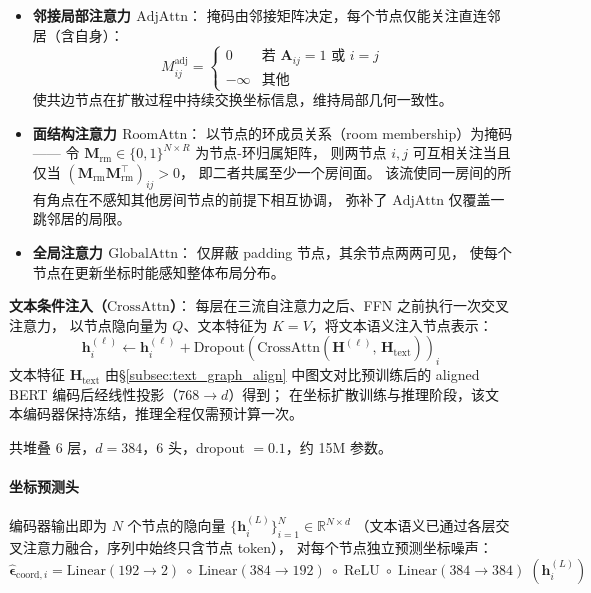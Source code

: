 \begin{itemize}
    \item \textbf{邻接局部注意力 $\mathrm{AdjAttn}$}：
    掩码由邻接矩阵决定，每个节点仅能关注直连邻居（含自身）：
    \begin{equation}
        M_{ij}^{\mathrm{adj}} =
        \begin{cases}
            0       & \text{若 } \mathbf{A}_{ij} = 1 \text{ 或 } i = j \\
            -\infty & \text{其他}
        \end{cases}
        \label{eq:adj_mask}
    \end{equation}
    使共边节点在扩散过程中持续交换坐标信息，维持局部几何一致性。

    \item \textbf{面结构注意力 $\mathrm{RoomAttn}$}：
    以节点的环成员关系（room membership）为掩码——
    令 $\mathbf{M}_{\mathrm{rm}} \in \{0,1\}^{N \times R}$ 为节点-环归属矩阵，
    则两节点 $i,j$ 可互相关注当且仅当 $(\mathbf{M}_{\mathrm{rm}}\mathbf{M}_{\mathrm{rm}}^\top)_{ij} > 0$，
    即二者共属至少一个房间面。
    该流使同一房间的所有角点在不感知其他房间节点的前提下相互协调，
    弥补了 $\mathrm{AdjAttn}$ 仅覆盖一跳邻居的局限。

    \item \textbf{全局注意力 $\mathrm{GlobalAttn}$}：
    仅屏蔽 padding 节点，其余节点两两可见，
    使每个节点在更新坐标时能感知整体布局分布。
\end{itemize}

\noindent
\textbf{文本条件注入（$\mathrm{CrossAttn}$）}：
每层在三流自注意力之后、FFN 之前执行一次交叉注意力，
以节点隐向量为 $Q$、文本特征为 $K{=}V$，将文本语义注入节点表示：
\begin{equation}
    \mathbf{h}_i^{(\ell)} \leftarrow \mathbf{h}_i^{(\ell)}
    + \mathrm{Dropout}\!\left(\mathrm{CrossAttn}(\mathbf{H}^{(\ell)},\, \mathbf{H}_{\mathrm{text}})\right)_{\!i}
    \label{eq:cross_attn}
\end{equation}
文本特征 $\mathbf{H}_{\mathrm{text}}$ 由\S\ref{subsec:text_graph_align} 中图文对比预训练后的
aligned BERT 编码后经线性投影（$768\to d$）得到；
在坐标扩散训练与推理阶段，该文本编码器保持冻结，推理全程仅需预计算一次。

共堆叠 6 层，$d = 384$，6 头，dropout $= 0.1$，约 15M 参数。

\paragraph{坐标预测头}
编码器输出即为 $N$ 个节点的隐向量 $\{\mathbf{h}_i^{(L)}\}_{i=1}^{N} \in \mathbb{R}^{N \times d}$
（文本语义已通过各层交叉注意力融合，序列中始终只含节点 token），
对每个节点独立预测坐标噪声：
\begin{equation}
    \hat{\boldsymbol{\epsilon}}_{\mathrm{coord},i}
    = \mathrm{Linear}(192{\to}2)\;\circ\;\mathrm{Linear}(384{\to}192)\;\circ\;\mathrm{ReLU}\;\circ\;\mathrm{Linear}(384{\to}384)\;\left(\mathbf{h}_i^{(L)}\right)
\end{equation}


